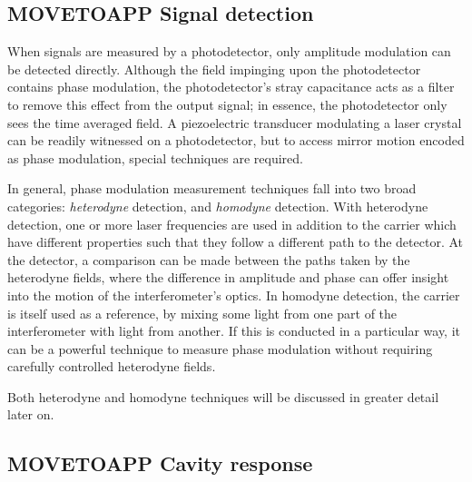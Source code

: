 \subsection{MOVETOAPP Signal detection}
When signals are measured by a photodetector, only amplitude modulation can be detected directly. Although the field impinging upon the photodetector contains phase modulation, the photodetector's stray capacitance acts as a filter to remove this effect from the output signal; in essence, the photodetector only sees the time averaged field. A piezoelectric transducer modulating a laser crystal can be readily witnessed on a photodetector, but to access mirror motion encoded as phase modulation, special techniques are required.

In general, phase modulation measurement techniques fall into two broad categories: \emph{heterodyne} detection, and \emph{homodyne} detection. With heterodyne detection, one or more laser frequencies are used in addition to the carrier which have different properties such that they follow a different path to the detector. At the detector, a comparison can be made between the paths taken by the heterodyne fields, where the difference in amplitude and phase can offer insight into the motion of the interferometer's optics. In homodyne detection, the carrier is itself used as a reference, by mixing some light from one part of the interferometer with light from another. If this is conducted in a particular way, it can be a powerful technique to measure phase modulation without requiring carefully controlled heterodyne fields.

Both heterodyne and homodyne techniques will be discussed in greater detail later on.



\subsection{MOVETOAPP Cavity response}

